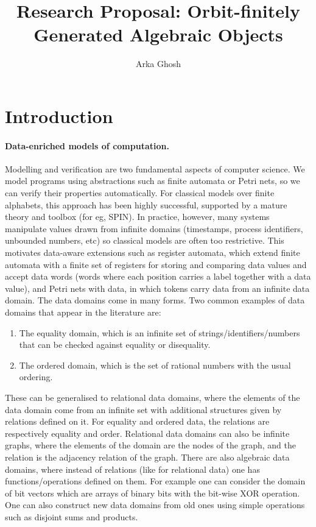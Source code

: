 \documentclass[a4paper,11pt]{article}
\title{
Research Proposal:
Orbit-finitely Generated Algebraic Objects
}
\author{Arka Ghosh}%
\date{}
\begin{document}
%
%
%
\maketitle
%
\raggedbottom
%
\section{Introduction}
%
\paragraph*{Data-enriched models of computation.}
Modelling and verification are two fundamental aspects of computer science.
We model programs using abstractions such as finite automata or Petri nets,
so we can verify their properties automatically.
For classical models over finite alphabets,
this approach has been highly successful,
supported by a mature theory and toolbox (for eg, SPIN).
In practice, however, many systems manipulate values drawn from infinite domains (timestamps, process identifiers, unbounded numbers, etc) so classical models are often too restrictive.
This motivates data-aware extensions such as register automata,
which extend finite automata with a finite set of registers for storing and comparing data values and accept data words (words where each position carries a label together with a data value),
and Petri nets with data, in which tokens carry data from an infinite data domain.
The data domains come in many forms.
Two common examples of data domains that appear in the literature are:
%
\begin{enumerate}
\item The equality domain, which is an infinite set of strings/identifiers/numbers that can be
checked against equality or disequality.
\item The ordered domain, which is the set of rational numbers with the usual ordering.
\end{enumerate}
These can be generalised to relational data domains,
where the elements of the data domain come from an infinite set with additional structures given by relations defined on it.
For equality and ordered data,
the relations are respectively equality and order.
Relational data domains can also be infinite graphs, where the elements of the domain are the nodes of the graph,
and the relation is the adjacency relation of the graph.
There are also algebraic data domains,
where instead of relations (like for relational data) one has functions/operations defined on them.
For example one can consider the domain of bit vectors \cite[Section 7.3.2]{atombook} which are arrays of binary bits with the bit-wise XOR operation.
One can also construct new data domains from old ones using simple operations such as disjoint sums and products.
\end{document}
